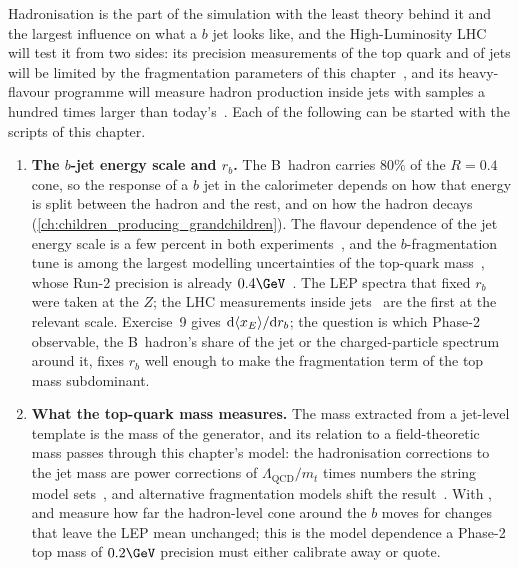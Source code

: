 Hadronisation is the part of the simulation with the least theory behind
it and the largest influence on what a $b$ jet looks like, and the
High-Luminosity LHC will test it from two sides: its precision
measurements of the top quark and of jets will be limited by the
fragmentation parameters of this chapter~\cite{Azzi:2019yne}, and its
heavy-flavour programme will measure hadron production inside jets with
samples a hundred times larger than today's~\cite{Cerri:2018ypt}. Each of
the following can be started with the scripts of this chapter.
\begin{enumerate}
  \item \textbf{The $b$-jet energy scale and $r_b$.} The B~hadron carries
    $80\%$ of the $R=0.4$ cone, so the response of a $b$ jet in the
    calorimeter depends on how that energy is split between the hadron
    and the rest, and on how the hadron decays
    (\cref{ch:children_producing_grandchildren}). The flavour dependence
    of the jet energy scale is a few percent in both
    experiments~\cite{CMS:2016lmd,ATLAS:2020cli}, and the $b$-fragmentation
    tune is among the largest modelling uncertainties of the top-quark
    mass~\cite{CMS:2018quc,CMS:2023ebf,Corcella:2017rpt}, whose Run-2
    precision is already $0.4\GeV$~\cite{ATLAS:2024dxp}. The LEP spectra
    that fixed $r_b$~\cite{ALEPH:2001pfo,OPAL:2002plk,SLD:2002poq,DELPHI:2011aa}
    were taken at the $Z$; the LHC measurements inside
    jets~\cite{ATLAS:2021agf,CMS:2021sln} are the first at the relevant
    scale. Exercise~9 gives $\mathrm{d}\langle x_E\rangle/\mathrm{d}r_b$;
    the question is which Phase-2 observable, the B~hadron's share of the
    jet or the charged-particle spectrum around it, fixes $r_b$ well
    enough to make the fragmentation term of the top mass subdominant.
  \item \textbf{What the top-quark mass measures.} The mass extracted from
    a jet-level template is the mass of the generator, and its relation to
    a field-theoretic mass passes through this chapter's model: the
    hadronisation corrections to the jet mass are power corrections of
    $\Lambda_{\mathrm{QCD}}/m_t$ times numbers the string model
    sets~\cite{Nason:2017cxd,Hoang:2020iah}, and alternative fragmentation
    models shift the result~\cite{Corcella:2010qgp,Corcella:2017rpt}. With
    ,  and  measure how far
    the hadron-level cone around the $b$ moves for changes that leave the
    LEP mean unchanged; this is the model dependence a Phase-2 top mass of
    $0.2\GeV$ precision must either calibrate away or quote.

\end{enumerate}
